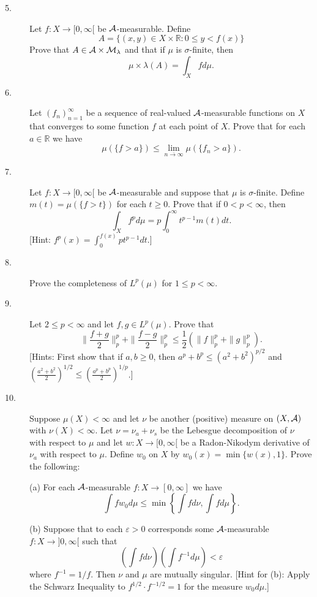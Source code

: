 \documentclass{article}
\def\R{\mathbb R}
\begin{document}
\begin{description}
\item[5.]
Let $f:X \to [0,\infty[$ be ${\cal A}$-measurable. Define
$$A=\{(x,y) \in X \times \R: 0 \leq y < f(x)\}$$
Prove that $A\in {\cal A} \times {\cal M}_\lambda$ and that if $\mu$
is $\sigma$-finite, then
$$\mu \times \lambda (A) = \int_X fd\mu.$$

\item[6.]
Let $(f_n)^\infty_{n=1}$ be a sequence of real-valued ${\cal A}$-measurable
functions on $X$ that converges to some function $f$ at each point of $X$.
Prove that for each $a\in \R$ we have
$$\mu (\{f > a\}) \leq \lim_{\overline{n \to \infty}}
  \mu (\{f_n > a\}).$$

\item[7.]
Let $f: X \to [0,\infty [$ be ${\cal A}$-measurable and suppose that $\mu$
is $\sigma$-finite. Define $m(t)=\mu (\{f >t\})$ for each $t\geq 0$. Prove
that if $0<p< \infty$, then
$$\int_X f^p d\mu = p \int^\infty_0 t^{p-1} m(t) dt.$$
[Hint: $f^p(x) = \int^{f(x)}_0 pt^{p-1} dt$.]

\item[8.]
Prove the completeness of $L^p(\mu)$ for $1\leq p < \infty$.

\item[9.]
Let $2 \leq p < \infty$ and let $f,g \in L^p (\mu)$. Prove that
$$\parallel \frac{f+g}{2} \parallel^p_p +
  \parallel \frac{f-g}{2} \parallel^p_p \leq \frac{1}{2}
  (\parallel f \parallel^p_p + \parallel g \parallel^p_p).$$
[Hints: First show that if $a,b \geq 0$, then
$a^p+b^p \leq (a^2 + b^2)^{p/2}$ and
$\left(\frac{a^2 +b^2}{2} \right)^{1/2} \leq \left(\frac{a^p+b^p}{2}
 \right)^{1/p}$.]

\item[10.]
Suppose $\mu(X) < \infty$ and let $\nu$ be another (positive) measure on
$(X, {\cal A})$ with $\nu(X) < \infty$. Let $\nu = \nu_a + \nu_s$ be the
Lebesgue decomposition of $\nu$ with respect to $\mu$ and let
$w:X \to [0,\infty[$ be a Radon-Nikodym derivative of $\nu_a$ with respect to
$\mu$. Define $w_0$ on $X$ by $w_0(x) = \min\{w(x),1\}$. Prove the following:

\item[\quad] (a)
For each ${\cal A}$-measurable $f:X \to [0, \infty]$ we have
$$\int fw_0 d\mu \leq \min \left\{\int fd\nu, \int fd\mu \right\}.$$

\item[\quad] (b)
Suppose that to each $\varepsilon >0$ corresponds some ${\cal A}$-measurable
$f:X \to ]0,\infty[$ such that
$$\left(\int fd\nu \right) \left(\int f^{-1} d\mu \right) < \varepsilon$$
where $f^{-1} = 1/f$. Then $\nu$ and $\mu$ are mutually singular. [Hint for
(b): Apply the Schwarz Inequality to $f^{1/2} \cdot f^{-1/2} =1$ for the
measure $w_0d\mu$.]





\end{description}    
\end{document}
